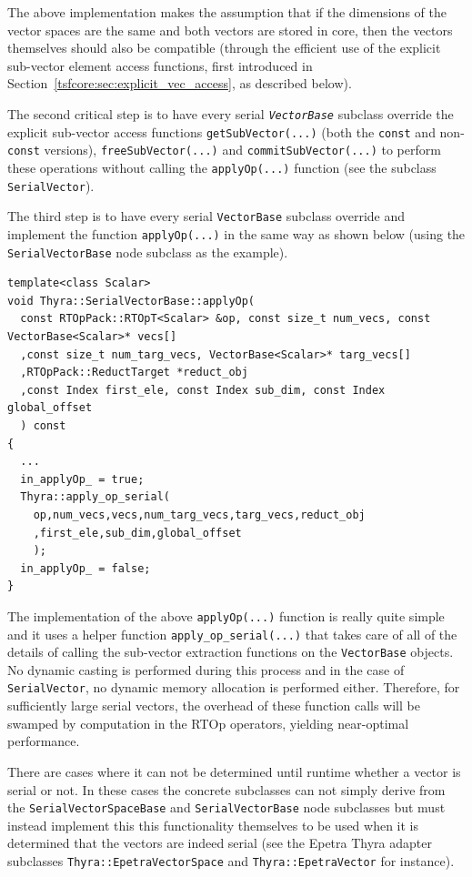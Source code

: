 \documentclass[pdf,ps2pdf,11pt]{SANDreport}
\begin{document}
{}\noindent{}The above implementation makes the assumption that if the
dimensions of the vector spaces are the same and both vectors are stored in
core, then the vectors themselves should also be compatible (through the
efficient use of the explicit sub-vector element access functions, first
introduced in Section~\ref{tsfcore:sec:explicit_vec_access}, as described
below).

The second critical step is to have every serial
{}\texttt{\textit{Vector\-Base}} subclass override the explicit sub-vector
access functions {}\texttt{getSubVector(...)} (both the {}\texttt{const}
and non-\texttt{const} versions), {}\texttt{free\-Sub\-Vector(...)}
and {}\texttt{commit\-Sub\-Vector(...)} to perform these operations
without calling the {}\texttt{applyOp(\-...)} function (see the subclass
{}\texttt{SerialVector}).

The third step is to have every serial {}\texttt{Vector\-Base} subclass
override and implement the function {}\texttt{applyOp(\-...)} in the
same way as shown below (using the {}\texttt{SerialVectorBase} node
subclass as the example).

{\scriptsize\begin{verbatim}
template<class Scalar>
void Thyra::SerialVectorBase::applyOp(
  const RTOpPack::RTOpT<Scalar> &op, const size_t num_vecs, const VectorBase<Scalar>* vecs[]
  ,const size_t num_targ_vecs, VectorBase<Scalar>* targ_vecs[]
  ,RTOpPack::ReductTarget *reduct_obj
  ,const Index first_ele, const Index sub_dim, const Index global_offset
  ) const
{
  ...
  in_applyOp_ = true;
  Thyra::apply_op_serial(
    op,num_vecs,vecs,num_targ_vecs,targ_vecs,reduct_obj
    ,first_ele,sub_dim,global_offset
    );
  in_applyOp_ = false;
}
\end{verbatim}}

{}\noindent{}The implementation of the above {}\texttt{applyOp(\-...)}
function is really quite simple and it uses a helper function
{}\texttt{apply\_op\_serial(...)}  that takes care of all of the
details of calling the sub-vector extraction functions on the
{}\texttt{Vector\-Base} objects.  No dynamic casting is performed during
this process and in the case of {}\texttt{SerialVector}, no dynamic
memory allocation is performed either.  Therefore, for sufficiently
large serial vectors, the overhead of these function calls will be
swamped by computation in the RTOp operators, yielding near-optimal
performance.

There are cases where it can not be determined until runtime whether a
vector is serial or not.  In these cases the concrete subclasses can
not simply derive from the {}\texttt{Serial\-VectorSpace\-Base} and
{}\texttt{SerialVectorBase} node subclasses but must instead implement
this this functionality themselves to be used when it is determined
that the vectors are indeed serial (see the Epetra Thyra adapter
subclasses {}\texttt{Thyra::EpetraVectorSpace} and
{}\texttt{Thyra::EpetraVector} for instance).
\end{document}
